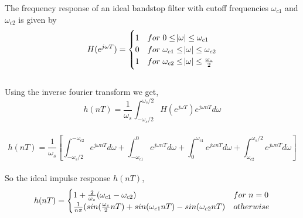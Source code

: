\documentclass[11pt]{article}
\begin{document}
\justify
    The frequency response of an ideal bandstop filter with cutoff frequencies $\omega_{c1}$ and $\omega_{c2}$ is given by\\
    \[
     H(e^{j\omega T}) = \begin{cases}
     1 & for \hspace*{3pt} 0 \leq \abs{\omega} \leq \omega_{c1} \\
     0 & for \hspace*{3pt} \omega_{c1} \leq \abs{\omega} \leq \omega_{c2} \\
     1 & for \hspace*{3pt} \omega_{c2} \leq \abs{\omega} \leq \frac{\omega_s}{2}
    \end{cases}
    \]\\
    Using the inverse fourier transform we get,\\
    $$h(nT) = \frac{1}{\omega_s}\int_{-\omega_s/2}^{\omega_s/2}H(e^{j\omega T})e^{j\omega nT}d\omega$$\\
    \vspace*{-20pt}
    $$h(nT) = \frac{1}{\omega_s}\left[\int_{-\omega_s/2}^{-\omega_{c2}}e^{j\omega nT}d\omega+\int_{-\omega_{c1}}^{0}e^{j\omega nT}d\omega+\int_{0}^{\omega_{c1}}e^{j\omega nT}d\omega+\int_{\omega_{c2}}^{\omega_s/2}e^{j\omega nT}d\omega\right]$$\\
    So the ideal impulse response $h(nT)$,\\
    \[
     h(nT) = \begin{cases}
     1 + \frac{2}{\omega_s}(\omega_{c1}-\omega_{c2}) & for \hspace*{3pt} n=0\\
     \frac{1}{n\pi}(sin(\frac{\omega_s}{2}nT) + sin(\omega_{c1}nT) - sin(\omega_{c2}nT) & otherwise
    \end{cases}
    \]\\
\end{document}
